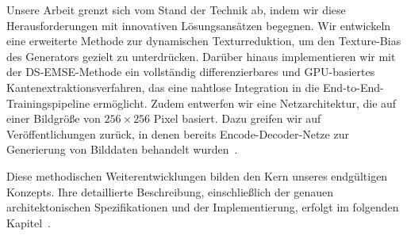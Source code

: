 Unsere Arbeit grenzt sich vom Stand der Technik ab, indem wir diese Herausforderungen mit innovativen Lösungsansätzen begegnen. Wir entwickeln eine erweiterte Methode zur dynamischen Texturreduktion, um den Texture-Bias des Generators gezielt zu unterdrücken. Darüber hinaus implementieren wir mit der \ac{DS-EMSE}-Methode ein vollständig differenzierbares und \ac{GPU}-basiertes Kantenextraktionsverfahren, das eine nahtlose Integration in die End-to-End-Trainingspipeline ermöglicht. Zudem entwerfen wir eine Netzarchitektur, die auf einer Bildgröße von $256 \times 256$ Pixel basiert. Dazu greifen wir auf Veröffentlichungen zurück, in denen bereits Encode-Decoder-Netze zur Generierung von Bilddaten behandelt wurden~\cite{badrinarayanan2017segnet, ronneberger2015unet, krizhevsky2009learning, isola2018Pix2Pix}.

Diese methodischen Weiterentwicklungen bilden den Kern unseres endgültigen Konzepts. Ihre detaillierte Beschreibung, einschließlich der genauen architektonischen Spezifikationen und der Implementierung, erfolgt im folgenden Kapitel~.

